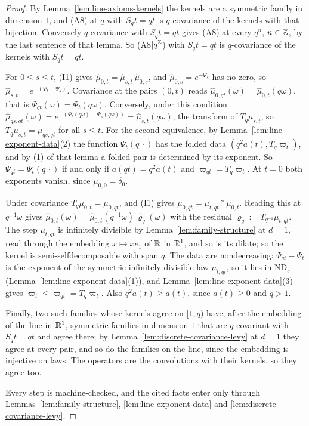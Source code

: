 \begin{proof}
\leanok
{}
By Lemma~\ref{lem:line-axioms-kernels} the kernels are a symmetric family in dimension $1$, and
(A8) at $q$ with $S_qt = qt$ is $q$-covariance of the kernels with that bijection. Conversely
$q$-covariance with $S_q t = qt$ gives (A8) at every $q^n$, $n \in \mathbb{Z}$, by the last sentence of
that lemma. So (A8$|q^{\mathbb{Z}}$) with $S_qt = qt$ is $q$-covariance of the kernels with
$S_qt = qt$.

For $0 \le s \le t$, (I1) gives $\widehat\mu_{0,t} = \widehat\mu_{s,t}\,\widehat\mu_{0,s}$, and
$\widehat\mu_{0,s} = e^{-\Psi_s}$ has no zero, so
$\widehat\mu_{s,t} = e^{-(\Psi_t - \Psi_s)}$. Covariance at the pairs $(0, t)$ reads
$\widehat\mu_{0,qt}(\omega) = \widehat\mu_{0,t}(q\omega)$, that is
$\Psi_{qt}(\omega) = \Psi_t(q\omega)$. Conversely, under this condition
$\widehat\mu_{qs,qt}(\omega) = e^{-(\Psi_t(q\omega) - \Psi_s(q\omega))} = \widehat\mu_{s,t}(q\omega)$,
the transform of $T_q\mu_{s,t}$, so $T_q\mu_{s,t} = \mu_{qs,qt}$ for all $s \le t$. For the
second equivalence, by Lemma~\ref{lem:line-exponent-data}(2) the function $\Psi_t(q\,\cdot)$ has
the folded data $(q^2a(t), T_q\varpi_t)$, and by (1) of that lemma a folded pair is determined by
its exponent. So $\Psi_{qt} = \Psi_t(q\,\cdot)$ if and only if $a(qt) = q^2a(t)$ and
$\varpi_{qt} = T_q\varpi_t$. At $t = 0$ both exponents vanish, since $\mu_{0,0} = \delta_0$.

Under covariance $T_q\mu_{0,t} = \mu_{0,qt}$, and (I1) gives
$\mu_{0,qt} = \mu_{t,qt} * \mu_{0,t}$. Reading this at $q^{-1}\omega$ gives
$\widehat\mu_{0,t}(\omega) = \widehat\mu_{0,t}(q^{-1}\omega)\,\widehat\varrho_q(\omega)$ with the
residual $\varrho_q := T_{q^{-1}}\mu_{t,qt}$. The step $\mu_{t,qt}$ is infinitely divisible by
Lemma~\ref{lem:family-structure} at $d = 1$, read through the embedding $x \mapsto xe_1$ of $\mathbb{R}$
in $\mathbb{R}^1$, and so is its dilate; so the kernel is semi-selfdecomposable with span $q$. The data
are nondecreasing: $\Psi_{qt} - \Psi_t$ is the exponent of the symmetric infinitely divisible law
$\mu_{t,qt}$, so it lies in $\mathrm{ND}_s$ (Lemma~\ref{lem:line-exponent-data}(1)), and
Lemma~\ref{lem:line-exponent-data}(3) gives $\varpi_t \le \varpi_{qt} = T_q\varpi_t$. Also
$q^2a(t) \ge a(t)$, since $a(t) \ge 0$ and $q > 1$.

Finally, two such families whose kernels agree on $[1, q)$ have, after the embedding of the line
in $\mathbb{R}^1$, symmetric families in dimension $1$ that are $q$-covariant with $S_qt = qt$ and agree
there; by Lemma~\ref{lem:discrete-covariance-levy} at $d = 1$ they agree at every pair, and so do
the families on the line, since the embedding is injective on laws. The operators are the
convolutions with their kernels, so they agree too.

Every step is machine-checked, and the cited facts enter only through
Lemmas~\ref{lem:family-structure}, \ref{lem:line-exponent-data} and
\ref{lem:discrete-covariance-levy}.
\end{proof}

